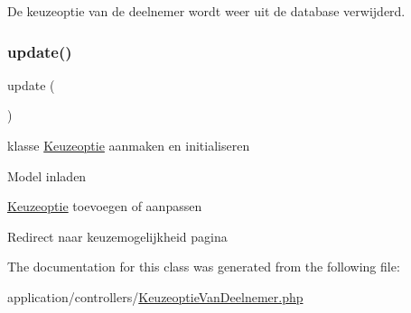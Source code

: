 De keuzeoptie van de deelnemer wordt weer uit de database verwijderd. 

\mbox{\label{class_keuze_optie_van_deelnemer_a842e4774e3b3601a005b995c02f7e883}} 
\subsubsection{\texorpdfstring{update()}{update()}}
{\footnotesize\ttfamily update (\begin{DoxyParamCaption}{ }\end{DoxyParamCaption})}

klasse \mbox{\hyperlink{class_keuzeoptie}{Keuzeoptie}} aanmaken en initialiseren

Model inladen

\mbox{\hyperlink{class_keuzeoptie}{Keuzeoptie}} toevoegen of aanpassen

Redirect naar keuzemogelijkheid pagina 

The documentation for this class was generated from the following file\+:\begin{DoxyCompactItemize}
\item 
application/controllers/\mbox{\hyperlink{_keuzeoptie_van_deelnemer_8php}{Keuzeoptie\+Van\+Deelnemer.\+php}}\end{DoxyCompactItemize}
